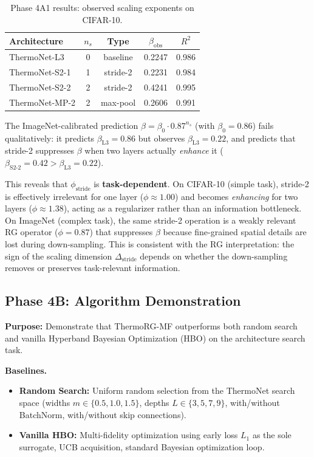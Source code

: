 \documentclass[11pt, a4paper]{article}
\theoremstyle{definition}
\begin{document}
\begin{table}[h]
\centering
\begin{tabular}{lcccc}
\hline
Architecture & $n_s$ & Type & $\beta_{\mathrm{obs}}$ & $R^2$ \\ \hline
ThermoNet-L3 & 0 & baseline & 0.2247 & 0.986 \\
ThermoNet-S2-1 & 1 & stride-2 & 0.2231 & 0.984 \\
ThermoNet-S2-2 & 2 & stride-2 & 0.4241 & 0.995 \\
ThermoNet-MP-2 & 2 & max-pool & 0.2606 & 0.991 \\ \hline
\end{tabular}
\caption{Phase 4A1 results: observed scaling exponents on CIFAR-10.}
\label{tab:phase4a1}
\end{table}

The ImageNet-calibrated prediction $\beta = \beta_0 \cdot 0.87^{n_s}$ (with $\beta_0 = 0.86$) fails qualitatively: it predicts $\beta_{\mathrm{L3}} = 0.86$ but observes $\beta_{\mathrm{L3}} = 0.22$, and predicts that stride-2 suppresses $\beta$ when two layers actually \emph{enhance} it ($\beta_{\mathrm{S2\text{-}2}} = 0.42 > \beta_{\mathrm{L3}} = 0.22$). 

This reveals that $\phi_{\mathrm{stride}}$ is \textbf{task-dependent}. On CIFAR-10 (simple task), stride-2 is effectively irrelevant for one layer ($\phi \approx 1.00$) and becomes \emph{enhancing} for two layers ($\phi \approx 1.38$), acting as a regularizer rather than an information bottleneck. On ImageNet (complex task), the same stride-2 operation is a weakly relevant RG operator ($\phi = 0.87$) that suppresses $\beta$ because fine-grained spatial details are lost during down-sampling. This is consistent with the RG interpretation: the sign of the scaling dimension $\Delta_{\mathrm{stride}}$ depends on whether the down-sampling removes or preserves task-relevant information.

\subsection{Phase 4B: Algorithm Demonstration}
\label{sec:phase-4b-demo}

\textbf{Purpose:} Demonstrate that ThermoRG-MF outperforms both random search and vanilla Hyperband Bayesian Optimization (HBO) on the architecture search task.

\textbf{Baselines.}
\begin{itemize}
    \item \textbf{Random Search:} Uniform random selection from the ThermoNet search space (widths $m \in \{0.5, 1.0, 1.5\}$, depths $L \in \{3, 5, 7, 9\}$, with/without BatchNorm, with/without skip connections).
    \item \textbf{Vanilla HBO:} Multi-fidelity optimization using early loss $L_1$ as the sole surrogate, UCB acquisition, standard Bayesian optimization loop.
\end{itemize}
\end{document}
